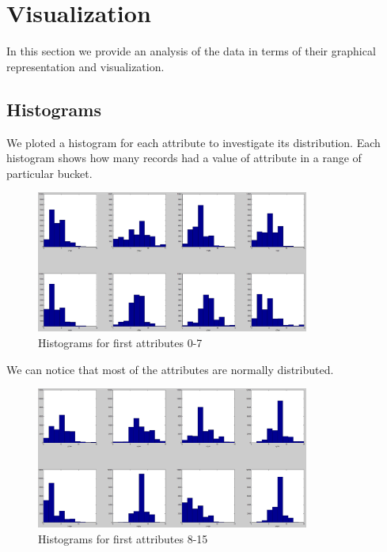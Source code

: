 \chapter*{Visualization}
In this section we provide an analysis of the data in terms of their
graphical representation and visualization. \\

\section*{Histograms}
We ploted a histogram for each attribute to investigate its distribution. 
Each histogram shows how many records had a value of attribute in a range
of particular bucket. \\
\begin{figure}[!tbh]
	\centering
	\includegraphics[width=0.8\textwidth]{figures/histograms_1}
	\caption{Histograms for first attributes 0-7}
	\label{fig:histograms_1}
\end{figure} 
\clearpage
We can notice that most of the attributes are normally distributed. \\
\begin{figure}[!tbh]
	\centering
	\includegraphics[width=0.8\textwidth]{figures/histograms_2}
	\caption{Histograms for first attributes 8-15}
	\label{fig:histograms_2}
\end{figure} 

